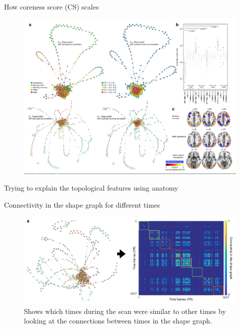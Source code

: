 \documentclass{beamer}
\begin{document}
\begin{frame}{How coreness score (CS) scales}
    \begin{figure}
        \includegraphics[width = 0.85\linewidth]{fig4.png}
    \end{figure}
\end{frame}

\begin{frame}{Trying to explain the topological features using anatomy}
     
\end{frame}

\begin{frame}{Connectivity in the shape graph for different times}
    \begin{figure}
        \includegraphics[width = 0.95\linewidth]{fig5a.png}
        \caption{Shows which times during the scan were similar to other times by looking at the connections between times in the shape graph.}
    \end{figure}
\end{frame}
\end{document}
